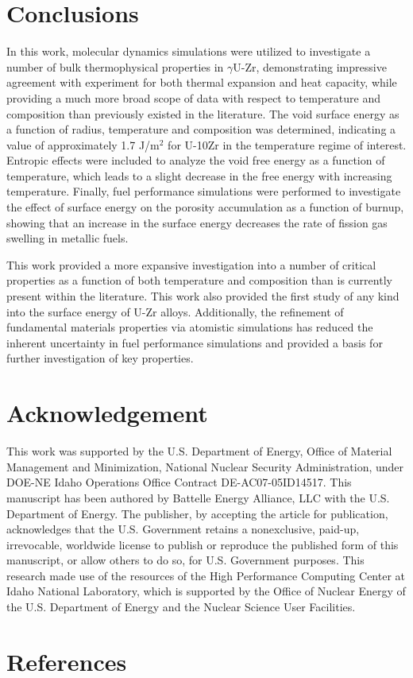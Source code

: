 \documentclass[review]{elsarticle}
\begin{document}
\FloatBarrier

\section{Conclusions}

In this work, molecular dynamics simulations were utilized to investigate a number of bulk thermophysical properties in $\gamma$U-Zr, demonstrating impressive agreement with experiment for both thermal expansion and heat capacity, while providing a much more broad scope of data with respect to temperature and composition than previously existed in the literature. The void surface energy as a function of radius, temperature and composition was determined, indicating a value of approximately 1.7 J/m$^2$ for U-10Zr in the temperature regime of interest. Entropic effects were included to analyze the void free energy as a function of temperature, which leads to a slight decrease in the free energy with increasing temperature. Finally, fuel performance simulations were performed to investigate the effect of surface energy on the porosity accumulation as a function of burnup, showing that an increase in the surface energy decreases the rate of fission gas swelling in metallic fuels. 

This work provided a more expansive investigation into a number of critical properties as a function of both temperature and composition than is currently present within the literature. This work also provided the first study of any kind into the surface energy of U-Zr alloys. Additionally, the refinement of fundamental materials properties via atomistic simulations has reduced the inherent uncertainty in fuel performance simulations and provided a basis for further investigation of key properties.


\section{Acknowledgement}
This work was supported by the U.S. Department of Energy, Office of Material Management and Minimization, National Nuclear Security Administration, under DOE-NE Idaho Operations Office Contract DE-AC07-05ID14517. This manuscript has been authored by Battelle Energy Alliance, LLC with the U.S. Department of Energy. The publisher, by accepting the article for publication, acknowledges that the U.S. Government retains a nonexclusive, paid-up, irrevocable, worldwide license to publish or reproduce the published form of this manuscript, or allow others to do so, for U.S. Government purposes. This research made use of the resources of the High Performance Computing Center at Idaho National Laboratory, which is supported by the Office of Nuclear Energy of the U.S. Department of Energy and the Nuclear Science User Facilities.

\section{References}


\end{document}
